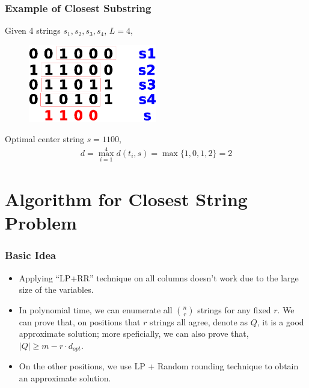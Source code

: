 \documentclass[slidestop,compress,mathserif,10pt]{beamer}
\begin{document}
\frame
{
\frametitle{Example of \sc Closest Substring}
Given 4 strings $s_1, s_2, s_3, s_4$, $L=4$,
\begin{figure}
	\begin{center}
		\includegraphics[width=0.5\textwidth]{css.eps}
	\end{center}
\end{figure}
Optimal center string $s=1100$,
\begin{eqnarray*}
	d=\max_{i=1}^4 d(t_i, s) = \max\{1,0,1,2\} = 2
\end{eqnarray*}
}
\section{Algorithm for Closest String Problem}
\frame
{
\frametitle{Basic Idea}

\begin{itemize} 

\item Applying ``LP+RR'' technique on all columns doesn't work due to the large size of the variables.  

\item 

In polynomial time, we can enumerate all ${n \choose r}$ strings for any fixed $r$. We can prove that, on positions that $r$ strings all agree, denote as $Q$, it is a good approximate solution; more speficially,  we can also prove that, $|Q| \ge m - r\cdot d_{opt}$.

\item 
On the other positions, we use LP + Random rounding technique to obtain an approximate solution.

\end{itemize}

}
\end{document}
